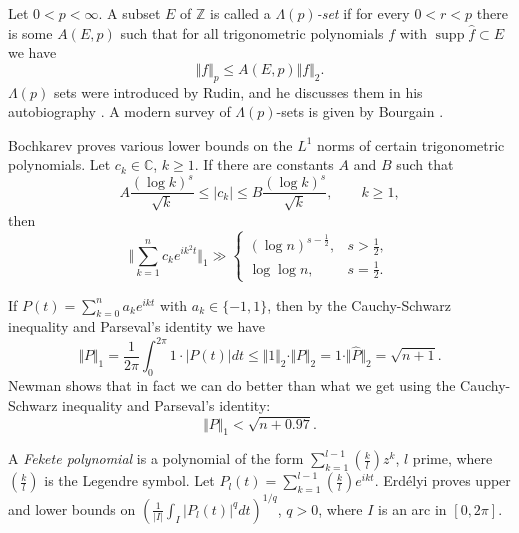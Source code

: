 \documentclass{article}
\newcommand{\norm}[1]{\Vert #1 \Vert}
\newcommand{\supp}{\mathop{\mathrm{supp}}}
\theoremstyle{definition}
\begin{document}
Let $0< p <\infty$. A subset $E$ of $\mathbb{Z}$ is called a {\em $\Lambda(p)$-set} if 
for every $0<r<p$ there is some $A(E,p)$ such that for all trigonometric polynomials $f$ with $\supp \hat{f} \subset E$ we have
\[
\norm{f}_p \leq A(E,p) \norm{f}_2.
\]
$\Lambda(p)$ sets were introduced by Rudin, and he discusses them in his autobiography \cite[Chapter~28]{MR1413303}. 
A modern survey of $\Lambda(p)$-sets is given by Bourgain \cite{bourgain}.

Bochkarev \cite{MR2301609} proves various lower bounds on the $L^1$ norms of certain trigonometric polynomials.
Let $c_k \in \mathbb{C}$, $k \geq 1$. 
If there are constants $A$ and $B$ such that
\[
A\frac{(\log k)^s}{\sqrt{k}} \leq |c_k| \leq B\frac{(\log k)^s}{\sqrt{k}}, \qquad k \geq 1,
\]
then \cite[p.~58, Theorem~19]{MR2301609}
\[
\norm{\sum_{k=1}^n c_k e^{ik^2 t}}_1 \gg 
\begin{cases}
(\log n)^{s-\frac{1}{2}},&s>\frac{1}{2},\\
\log \log n,&s=\frac{1}{2}.
\end{cases}
\]

If $P(t)=\sum_{k=0}^n a_k e^{ikt}$ with $a_k \in \{-1,1\}$, then by the Cauchy-Schwarz inequality and Parseval's identity we have
\[
\norm{P}_1=\frac{1}{2\pi}\int_0^{2\pi} 1 \cdot |P(t)| dt \leq \norm{1}_2\cdot \norm{P}_2 = 1\cdot \norm{\hat{P}}_2 = \sqrt{n+1}.
\]
Newman \cite{newman} shows that in fact we can do better than what we get using the Cauchy-Schwarz inequality and Parseval's identity:
\[
\norm{P}_1 < \sqrt{n+0.97}.
\]

A {\em Fekete polynomial} is a polynomial of the form $\sum_{k=1}^{l-1} \left( \frac{k}{l} \right) z^k$, $l$ prime, where
$\left( \frac{k}{l} \right)$ is the Legendre symbol. Let $P_l(t)=\sum_{k=1}^{l-1} \left( \frac{k}{l} \right) e^{ikt}$. Erd{\'e}lyi \cite{MR2899817}
proves upper and lower bounds on $\left( \frac{1}{|I|} \int_I |P_l(t)|^q dt \right)^{1/q}$, $q>0$, where $I$ is an arc in $[0,2\pi]$.



\end{document}
